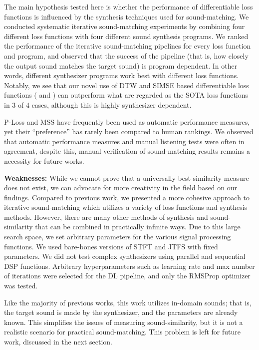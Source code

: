 The main hypothesis tested here is whether the performance of differentiable loss functions is influenced by the synthesis techniques used for sound-matching. We conducted systematic iterative sound-matching experiments by combining four different loss functions with four different sound synthesis programs. We ranked the performance of the iterative sound-matching pipelines for every loss function and program, and observed that the success of the pipeline (that is, how closely the output sound matches the target sound) is program dependent. In other words, different synthesizer programs work best with different loss functions. Notably, we see that our novel use of DTW and SIMSE based differentiable loss functions (\DTWEnv{} and \SIMSESpec) can outperform what are regarded as the SOTA loss functions in 3 of 4 cases, although this is highly synthesizer dependent. 



P-Loss and MSS have frequently been used as automatic performance measures, yet their ``preference'' has rarely been compared to human rankings. We observed that automatic performance measures and manual listening tests were often in agreement, despite this, manual verification of sound-matching results remains a necessity for future works.  

\textbf{Weaknesses:} 
While we cannot prove that a universally best similarity measure does not exist, we can advocate for more creativity in the field based on our findings. Compared to previous work, we presented a more cohesive approach to iterative sound-matching which utilizes a variety of loss functions and synthesis methods. However, there are many other methods of synthesis and sound-similarity that can be combined in practically infinite ways. Due to this large search space, we set arbitrary parameters for the various signal processing functions. We used bare-bones versions of STFT and JTFS with fixed parameters. We did not test complex synthesizers using parallel and sequential DSP functions. Arbitrary hyperparameters such as learning rate and max number of iterations were selected for the DL pipeline, and only the RMSProp optimizer was tested. 

 Like the majority of previous works, this work utilizes in-domain sounds; that is, the target sound is made by the synthesizer, and the parameters are already known. This simplifies the issues of measuring sound-similarity, but it is not a realistic scenario for practical sound-matching. This problem is left for future work, discussed in the next section.


